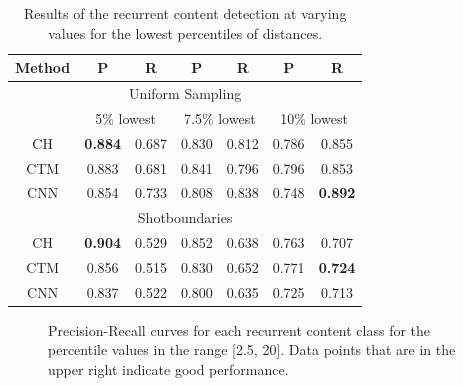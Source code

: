 \documentclass{report}
\begin{document}
\begin{table}[H]
	\begin{center}
		\begin{tabular}{ c c c c c c c} 
			\hline
			\textbf{Method} & \textbf{P} & \textbf{R} & \textbf{P} & \textbf{R} & \textbf{P} & \textbf{R} \\
			\hline
			\multicolumn{7}{c}{Uniform Sampling} \\
			 & \multicolumn{2}{c}{5\% lowest} & \multicolumn{2}{c}{7.5\% lowest} & \multicolumn{2}{c}{10\% lowest} \\
			\hline	
			CH 				& \textbf{0.884} 	& 0.687		& 0.830 	& 0.812 	& 0.786	 	& 0.855 \\
			CTM 			& 0.883 	& 0.681 		& 0.841 	& 0.796 & 0.796 	& 0.853 \\
			CNN 			& 0.854		& 0.733			& 0.808		& 0.838 & 0.748		& \textbf{0.892} \\
			\hline
			\multicolumn{7}{c}{Shotboundaries} \\
			\hline
			CH	 			& \textbf{0.904}		& 0.529 		& 0.852  	& 0.638 & 0.763	 	& 0.707 \\
			CTM 			& 0.856 	& 0.515 		& 0.830 	& 0.652 & 0.771		& \textbf{0.724} \\
			CNN 			& 0.837		& 0.522			& 0.800		& 0.635 & 0.725		& 0.713  \\
			\hline
		\end{tabular}
	\end{center}
	\caption{Results of the recurrent content detection at varying values for the lowest percentiles of distances.}
	\label{table:resultsrecurring}
\end{table}

\begin{figure}[h]
	\centering
	\caption{Precision-Recall curves for each recurrent content class for the percentile values in the range [2.5, 20]. Data points that are in the upper right indicate good performance.}
	\label{fig:precision-recall}
\end{figure}
\end{document}
